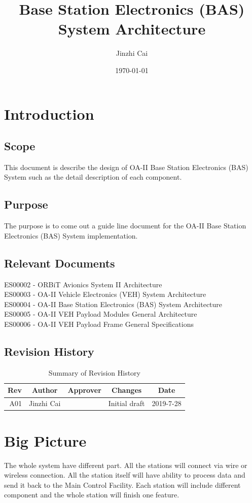 \documentclass[12pt,article]{memoir}
\title{Base Station Electronics (BAS) System Architecture}
\author{Jinzhi Cai}
\date{\today}
\begin{document}
	


\tableofcontents*
\clearpage


\chapter{Introduction}
\section{Scope}
This document is describe the design of OA-II Base Station Electronics (BAS) System such as the detail description of each component. 
\section{Purpose}
The purpose is to come out a guide line document for the OA-II Base Station Electronics (BAS) System implementation.
\section{Relevant Documents}
ES00002 - ORBiT Avionics System II Architecture\\
ES00003 - OA-II Vehicle Electronics (VEH) System Architecture\\
ES00004 - OA-II Base Station Electronics (BAS) System Architecture\\
ES00005 - OA-II VEH Payload Modules General Architecture\\
ES00006 - OA-II VEH Payload Frame General Specifications\\
\section{Revision History}
\begin{table}[H]
	\centering
	\begin{tabu}{r || c | c | c | c }
		Rev & Author     & Approver & Changes       & Date      \\ \hline
		A01 & Jinzhi Cai &          & Initial draft & 2019-7-28 \\
	\end{tabu}
	\caption{Summary of Revision History}
	\label{tab:rev}
\end{table}
\newpage
\chapter{Big Picture}
The whole system have different part. All the stations will connect via wire or wireless connection. All the station itself will have ability to process data and send it back to the Main Control Facility. Each station will include different component and the whole station will finish one feature.
\newpage
\end{document}
